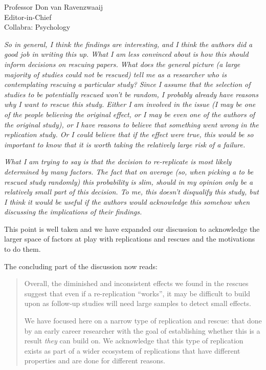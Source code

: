 \documentclass{stanfordletter}
\newcommand{\theysaid}[1]{\begin{leftbar} \noindent 
		\textsl{ #1}\end{leftbar}}
\newcommand{\revised}[1]{\begin{quote}	#1 \end{quote}}
\begin{document}
\begin{letter}{Professor Don van Ravenzwaaij \\ Editor-in-Chief \\ Collabra: Psychology }
		
		\theysaid{So in general, I think the findings are interesting, and I think the authors did a good job in writing this up. What I am less convinced about is how this should inform decisions on rescuing papers. What does the general picture (a large majority of studies could not be rescued) tell me as a researcher who is contemplating rescuing a particular study? Since I assume that the selection of studies to be potentially rescued won’t be random, I probably already have reasons why I want to rescue this study. Either I am involved in the issue (I may be one of the people believing the original effect, or I may be even one of the authors of the original study), or I have reasons to believe that something went wrong in the replication study. Or I could believe that if the effect were true, this would be so important to know that it is worth taking the relatively large risk of a failure.}
		
		\theysaid{What I am trying to say is that the decision to re-replicate is most likely determined by many factors. The fact that on average (so, when picking a to be rescued study randomly) this probability is slim, should in my opinion only be a relatively small part of this decision. To me, this doesn’t disqualify this study, but I think it would be useful if the authors would acknowledge this somehow when discussing the implications of their findings.}
		
		This point is well taken and we have expanded our discussion to acknowledge the larger space of factors at play with replications and rescues and the motivations to do them. 
		
		The concluding part of the discussion now reads: 
		
		\revised{Overall, the diminished and inconsistent effects we found in the rescues suggest that even if a re-replication ``works'', it may be difficult to build upon as follow-up studies will need large samples to detect small effects.
			\newline
			
			We have focused here on a narrow type of replication and rescue: that done by an early career researcher with the goal of establishing whether this is a result \emph{they} can build on. We acknowledge that this type of replication exists as part of a wider ecosystem of replications that have different properties and are done for different reasons.
			\newline
			
}
\end{letter}
\end{document}
